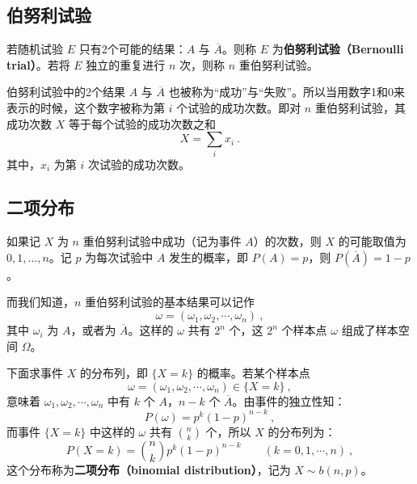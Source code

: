 

\subsection{伯努利试验}
\begin{definition}{}
若随机试验 $E$ 只有2个可能的结果：$A$ 与 $\overline{A}$。则称 $E$ 为\textbf{伯努利试验（Bernoulli trial）}。若将 $E$ 独立的重复进行 $n$ 次，则称 $n$ 重伯努利试验。
\end{definition}
伯努利试验中的2个结果 $A$ 与 $\overline{A}$ 也被称为“成功”与“失败”。所以当用数字1和0来表示的时候，这个数字被称为第 $i$ 个试验的成功次数。即对 $n$ 重伯努利试验，其成功次数 $X$ 等于每个试验的成功次数之和
\begin{equation}
X=\sum_i x_i~.
\end{equation}
其中，$x_i$ 为第 $i$ 次试验的成功次数。
\subsection{二项分布}
如果记 $X $ 为 $n $ 重伯努利试验中成功（记为事件 $A$）的次数，则 $X $ 的可能取值为 $0,1,\dots,n$。记 $p $ 为每次试验中 $A $ 发生的概率，即 $P(A)=p$，则 $P(\overline{A})=1-p$。

而我们知道，$n$ 重伯努利试验的基本结果可以记作
\begin{equation}
\omega=\left(\omega_{1}, \omega_{2}, \cdots, \omega_{n}\right)~,
\end{equation}
其中 $\omega_i$ 为 $A$，或者为 $\overline{A}$。这样的 $\omega$ 共有 $2^n$ 个，这 $2^n$ 个样本点 $\omega$ 组成了样本空间 $\Omega$。

下面求事件 $X$ 的分布列，即 $\{X=k\}$ 的概率。若某个样本点
\begin{equation}
\omega=\left(\omega_{1}, \omega_{2}, \cdots, \omega_{n}\right) \in\{X=k\}~,
\end{equation}
意味着 $\omega_1,\omega_2,\cdots,\omega_n$ 中有 $k$ 个 $A$，$n-k$ 个 $\overline A$。由事件的独立性知：
\begin{equation}
P(\omega)=p^{k}(1-p)^{n-k}~,
\end{equation}
而事件 $\{X=k\}$ 中这样的 $\omega$ 共有 $\binom nk$ 个，所以 $X$ 的分布列为：
\begin{equation}
P(X=k)=\binom nk p^{k}(1-p)^{n-k} \qquad (k=0,1, \cdots, n)~,
\end{equation}
这个分布称为\textbf{二项分布（binomial distribution）}，记为 $X\sim b(n, p)$。

